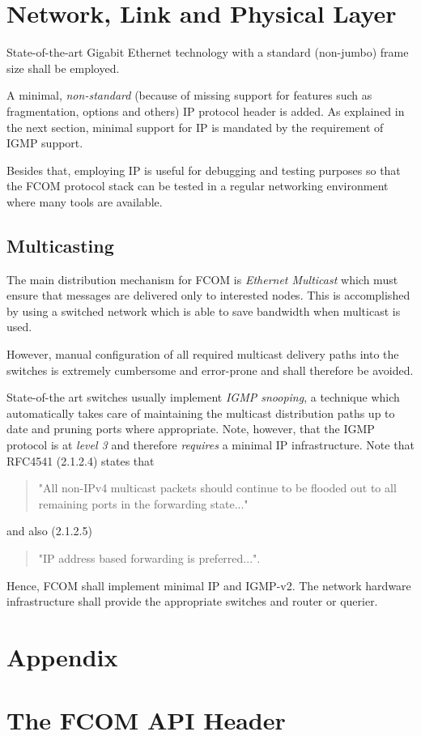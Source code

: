 \documentclass[11pt]{article}
\newcommand{\fcom}{FCOM}
\begin{document}
\section{Network, Link and Physical Layer}
State-of-the-art Gigabit Ethernet technology with a
standard (non-jumbo) frame size shall be employed.

A minimal, {\em non-standard} (because of missing support for
features such as fragmentation, options and others) IP protocol
header is added. As explained in the next section, minimal support
for IP is mandated by the requirement of IGMP support.

Besides that, employing IP is useful
for debugging and testing purposes so that the \fcom{}
protocol stack can be tested in a regular networking environment
where many tools are available.

\subsection{Multicasting}
The main distribution mechanism for \fcom{} is {\em Ethernet Multicast}
which must ensure that messages are delivered only to interested
nodes. This is accomplished by using a switched network which
is able to save bandwidth when multicast is used.

However,
manual configuration of all required multicast delivery
paths into the switches is extremely cumbersome and error-prone
and shall therefore be avoided.

State-of-the art switches usually implement {\em IGMP snooping},
a technique
which automatically takes care of maintaining the multicast
distribution paths up to date and pruning ports where appropriate.
Note, however, that the IGMP
protocol is at {\em level 3} and therefore {\em requires}
a minimal IP infrastructure. Note that RFC4541 (2.1.2.4) states
that
\begin{quotation}
\noindent
"All non-IPv4 multicast packets should continue to be
flooded out to all remaining ports in the forwarding state..."
\end{quotation}
and also (2.1.2.5)
\begin{quotation}
\noindent
"IP address based forwarding is preferred...".
\end{quotation}

Hence, \fcom{} shall implement minimal IP and IGMP-v2.
The network hardware infrastructure shall provide the
appropriate switches and router or querier.

\appendix
\pagebreak
\section*{Appendix}

\section{The \fcom{} API Header}
\label{app:api}
%
\lstset{basicstyle=\scriptsize, formfeed=\pagebreak}

\end{document}
